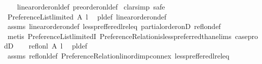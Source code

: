 \begin{isabellebody}
%
\isadelimproof
\ \ %
\endisadelimproof
%
\isatagproof
{}\isamarkupfalse%
\ linear{\isacharunderscore}{\kern0pt}order{\isacharunderscore}{\kern0pt}on{\isacharunderscore}{\kern0pt}l{\isacharunderscore}{\kern0pt}def\ preorder{\isacharunderscore}{\kern0pt}on{\isacharunderscore}{\kern0pt}l{\isacharunderscore}{\kern0pt}def\isanewline
{}\isamarkupfalse%
\ {\isacharparenleft}{\kern0pt}clarsimp{\isacharcomma}{\kern0pt}\ safe{\isacharparenright}{\kern0pt}\isanewline
\ \ \isamarkupfalse%
\ {\isachardoublequoteopen}Preference{\isacharunderscore}{\kern0pt}List{\isachardot}{\kern0pt}limited\ A\ l{\isachardoublequoteclose}\ \isamarkupfalse%
\ pl{\isacharunderscore}{\kern0pt}{\isasymalpha}{\isacharunderscore}{\kern0pt}def\ linear{\isacharunderscore}{\kern0pt}order{\isacharunderscore}{\kern0pt}on{\isacharunderscore}{\kern0pt}def\ \isanewline
\ \ \ \ \isamarkupfalse%
\ assms\ linear{\isacharunderscore}{\kern0pt}order{\isacharunderscore}{\kern0pt}on{\isacharunderscore}{\kern0pt}def\ less{\isacharunderscore}{\kern0pt}preffered{\isacharunderscore}{\kern0pt}l{\isacharunderscore}{\kern0pt}rel{\isacharunderscore}{\kern0pt}eq\ partial{\isacharunderscore}{\kern0pt}order{\isacharunderscore}{\kern0pt}onD{\isacharparenleft}{\kern0pt}{}{\isacharparenright}{\kern0pt}\ refl{\isacharunderscore}{\kern0pt}on{\isacharunderscore}{\kern0pt}def{\isacharprime}{\kern0pt}\isanewline
\ \ \ \ \isamarkupfalse%
\ {\isacharparenleft}{\kern0pt}metis\ Preference{\isacharunderscore}{\kern0pt}List{\isachardot}{\kern0pt}limitedI\ Preference{\isacharunderscore}{\kern0pt}Relation{\isachardot}{\kern0pt}is{\isacharunderscore}{\kern0pt}less{\isacharunderscore}{\kern0pt}preferred{\isacharunderscore}{\kern0pt}than{\isachardot}{\kern0pt}elims{\isacharparenleft}{\kern0pt}{}{\isacharparenright}{\kern0pt}\ case{\isacharunderscore}{\kern0pt}prodD{\isacharparenright}{\kern0pt}\isanewline
{}\isamarkupfalse%
\isanewline
\ \ \isamarkupfalse%
\ {\isachardoublequoteopen}refl{\isacharunderscore}{\kern0pt}on{\isacharunderscore}{\kern0pt}l\ A\ l{\isachardoublequoteclose}\ \isamarkupfalse%
\ pl{\isacharunderscore}{\kern0pt}{\isasymalpha}{\isacharunderscore}{\kern0pt}def\ \isanewline
\ \ \ \ \isamarkupfalse%
\ assms\ refl{\isacharunderscore}{\kern0pt}on{\isacharunderscore}{\kern0pt}l{\isacharunderscore}{\kern0pt}def\ Preference{\isacharunderscore}{\kern0pt}Relation{\isachardot}{\kern0pt}lin{\isacharunderscore}{\kern0pt}ord{\isacharunderscore}{\kern0pt}imp{\isacharunderscore}{\kern0pt}connex\ less{\isacharunderscore}{\kern0pt}preffered{\isacharunderscore}{\kern0pt}l{\isacharunderscore}{\kern0pt}rel{\isacharunderscore}{\kern0pt}eq\isanewline

\end{isabellebody}
